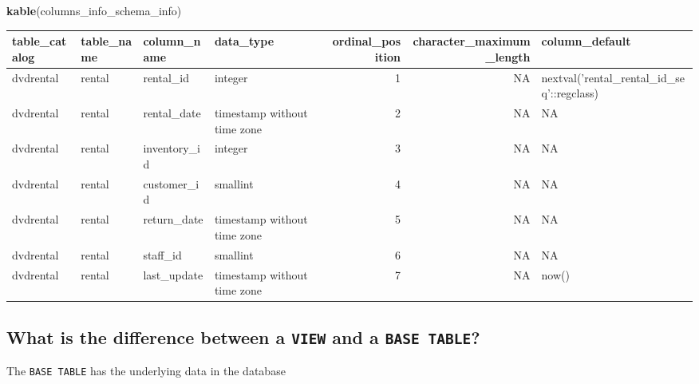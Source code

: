 \documentclass[]{book}
\newenvironment{Shaded}{\begin{snugshade}}{\end{snugshade}}
\newcommand{\KeywordTok}[1]{\textcolor[rgb]{0.13,0.29,0.53}{\textbf{#1}}}
\newcommand{\NormalTok}[1]{#1}
\theoremstyle{definition}
\theoremstyle{definition}
\theoremstyle{definition}
\theoremstyle{remark}
\begin{document}
\begin{Shaded}
\begin{Highlighting}[]
\KeywordTok{kable}\NormalTok{(columns_info_schema_info)}
\end{Highlighting}
\end{Shaded}

\begin{tabular}{l|l|l|l|r|r|l}
\hline
table\_catalog & table\_name & column\_name & data\_type & ordinal\_position & character\_maximum\_length & column\_default\\
\hline
dvdrental & rental & rental\_id & integer & 1 & NA & nextval('rental\_rental\_id\_seq'::regclass)\\
\hline
dvdrental & rental & rental\_date & timestamp without time zone & 2 & NA & NA\\
\hline
dvdrental & rental & inventory\_id & integer & 3 & NA & NA\\
\hline
dvdrental & rental & customer\_id & smallint & 4 & NA & NA\\
\hline
dvdrental & rental & return\_date & timestamp without time zone & 5 & NA & NA\\
\hline
dvdrental & rental & staff\_id & smallint & 6 & NA & NA\\
\hline
dvdrental & rental & last\_update & timestamp without time zone & 7 & NA & now()\\
\hline
\end{tabular}

\hypertarget{what-is-the-difference-between-a-view-and-a-base-table}{%
\subsection{\texorpdfstring{What is the difference between a
\texttt{VIEW} and a
\texttt{BASE\ TABLE}?}{What is the difference between a VIEW and a BASE TABLE?}}\label{what-is-the-difference-between-a-view-and-a-base-table}}

The \texttt{BASE\ TABLE} has the underlying data in the database
\end{document}
